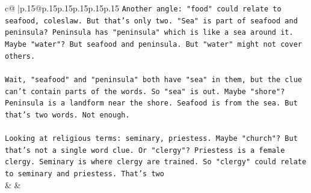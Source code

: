 \documentclass{article}
\begin{document}
{\begin{supertabular}{c@{$\;$}|p{.15\linewidth}@{}p{.15\linewidth}p{.15\linewidth}p{.15\linewidth}p{.15\linewidth}p{.15\linewidth}}
{{{\texttt{Another angle: "food" could relate to seafood, coleslaw. But that's only two. "Sea" is part of seafood and peninsula? Peninsula has "peninsula" which is like a sea around it. Maybe "water"? But seafood and peninsula. But "water" might not cover others.} \\
\\ 
\texttt{Wait, "seafood" and "peninsula" both have "sea" in them, but the clue can't contain parts of the words. So "sea" is out. Maybe "shore"? Peninsula is a landform near the shore. Seafood is from the sea. But that's two words. Not enough.} \\
\\ 
\texttt{Looking at religious terms: seminary, priestess. Maybe "church"? But that's not a single word clue. Or "clergy"? Priestess is a female clergy. Seminary is where clergy are trained. So "clergy" could relate to seminary and priestess. That's two} \\
            }
        }
    }
    & & \\ \\


\end{supertabular}}
\end{document}
